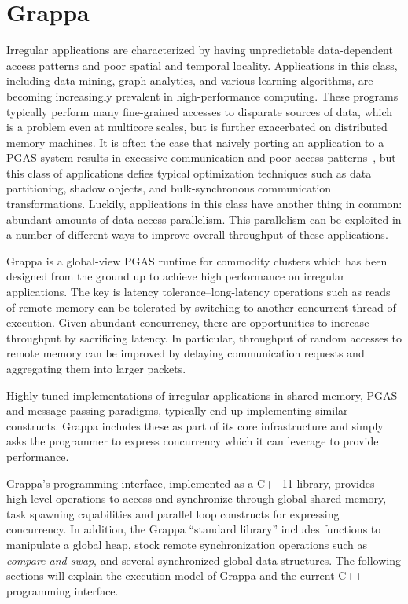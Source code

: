 \section{Grappa}

Irregular applications are characterized by having unpredictable data-dependent access patterns and poor spatial and temporal locality. Applications in this class, including data mining, graph analytics, and various learning algorithms, are becoming increasingly prevalent in high-performance computing. These programs typically perform many fine-grained accesses to disparate sources of data, which is a problem even at multicore scales, but is further exacerbated on distributed memory machines.
It is often the case that naively porting an application to a PGAS system results in excessive communication and poor access patterns~\cite{pgas-analysis}, but this class of applications defies typical optimization techniques such as data partitioning, shadow objects, and bulk-synchronous communication transformations.
Luckily, applications in this class have another thing in common: abundant amounts of data access parallelism. This parallelism can be exploited in a number of different ways to improve overall throughput of these applications.


Grappa is a global-view PGAS runtime for commodity clusters which has been designed from the ground up to achieve high performance on irregular applications. The key is latency tolerance--long-latency operations such as reads of remote memory can be tolerated by switching to another concurrent thread of execution. Given abundant concurrency, there are opportunities to increase throughput by sacrificing latency. In particular, throughput of random accesses to remote memory can be improved by delaying communication requests and aggregating them into larger packets.

Highly tuned implementations of irregular applications in shared-memory, PGAS and message-passing paradigms, typically end up implementing similar constructs. Grappa includes these as part of its core infrastructure and simply asks the programmer to express concurrency which it can leverage to provide performance.

Grappa's programming interface, implemented as a C++11 library, provides high-level operations to access and synchronize through global shared memory, task spawning capabilities and parallel loop constructs for expressing concurrency. In addition, the Grappa ``standard library'' includes functions to manipulate a global heap, stock remote synchronization operations such as \emph{compare-and-swap}, and several synchronized global data structures. The following sections will explain the execution model of Grappa and the current C++ programming interface.

